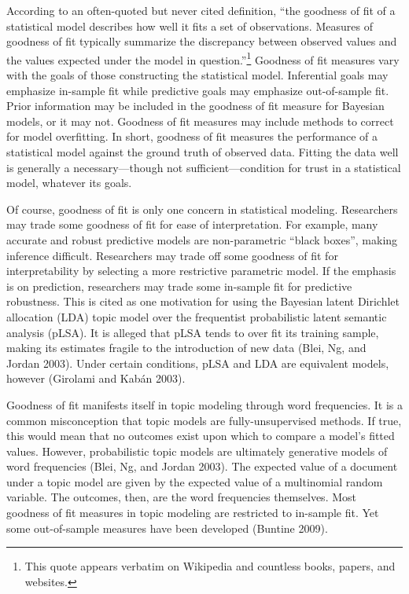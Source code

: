 \documentclass[conference,final,]{IEEEtran}
\begin{document}
According to an often-quoted but never cited definition, ``the goodness
of fit of a statistical model describes how well it fits a set of
observations. Measures of goodness of fit typically summarize the
discrepancy between observed values and the values expected under the
model in question.''\footnote{This quote appears verbatim on Wikipedia
  and countless books, papers, and websites.} Goodness of fit measures
vary with the goals of those constructing the statistical model.
Inferential goals may emphasize in-sample fit while predictive goals may
emphasize out-of-sample fit. Prior information may be included in the
goodness of fit measure for Bayesian models, or it may not. Goodness of
fit measures may include methods to correct for model overfitting. In
short, goodness of fit measures the performance of a statistical model
against the ground truth of observed data. Fitting the data well is
generally a necessary---though not sufficient---condition for trust in a
statistical model, whatever its goals.

Of course, goodness of fit is only one concern in statistical modeling.
Researchers may trade some goodness of fit for ease of interpretation.
For example, many accurate and robust predictive models are
non-parametric ``black boxes'', making inference difficult. Researchers
may trade off some goodness of fit for interpretability by selecting a
more restrictive parametric model. If the emphasis is on prediction,
researchers may trade some in-sample fit for predictive robustness. This
is cited as one motivation for using the Bayesian latent Dirichlet
allocation (LDA) topic model over the frequentist probabilistic latent
semantic analysis (pLSA). It is alleged that pLSA tends to over fit its
training sample, making its estimates fragile to the introduction of new
data (Blei, Ng, and Jordan 2003). Under certain conditions, pLSA and LDA
are equivalent models, however (Girolami and Kabán 2003).

Goodness of fit manifests itself in topic modeling through word
frequencies. It is a common misconception that topic models are
fully-unsupervised methods. If true, this would mean that no outcomes
exist upon which to compare a model's fitted values. However,
probabilistic topic models are ultimately generative models of word
frequencies (Blei, Ng, and Jordan 2003). The expected value of a
document under a topic model are given by the expected value of a
multinomial random variable. The outcomes, then, are the word
frequencies themselves. Most goodness of fit measures in topic modeling
are restricted to in-sample fit. Yet some out-of-sample measures have
been developed (Buntine 2009).
\end{document}
